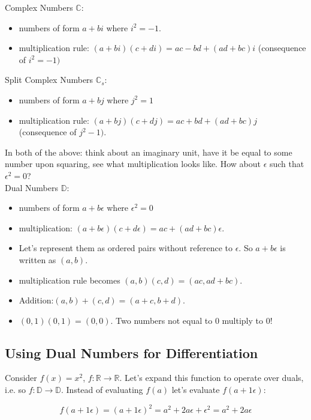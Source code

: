 \documentclass[11pt]{article}
\theoremstyle{definition}
\theoremstyle{plain}
\renewcommand{\b}[1]{\mathbb{#1}}
\begin{document}
\noindent Complex Numbers $\b{C}$:
\begin{itemize}
    \item numbers of form $a + bi$ where $i^2=-1$.
    \item multiplication rule: $(a+bi)(c+di) = ac - bd + (ad + bc)i$ 
          (consequence of $i^2=-1)$
\end{itemize}

\noindent Split Complex Numbers $\b{C}_s$:
\begin{itemize}
    \item numbers of form $a + bj$ where $j^2=1$ 
    \item multiplication rule: $(a + bj)(c + dj) = ac + bd + (ad + bc)j$ 
          (consequence of $j^2-1)$.
\end{itemize}

\noindent In both of the above: think about an imaginary unit, 
have it be equal to some number upon squaring, see what multiplication looks like.
How about $\epsilon$ such that $\epsilon^2=0$?\\

\noindent Dual Numbers $\b{D}$: 
\begin{itemize}
    \item numbers of form $a + b \epsilon$ where $\epsilon^2 = 0$
    \item multiplication: $(a + b \epsilon)(c + d \epsilon) = ac + (ad+bc)\epsilon$.
    \item Let's represent them as ordered pairs without reference to $\epsilon$.
    So $a + b\epsilon$ is written as $(a,b)$.
    \item multiplication rule becomes $(a,b)(c,d)=(ac,ad+bc)$. 
    \item Addition:$(a,b)+(c,d)=(a+c,b+d)$.
    \item $(0,1)(0,1)=(0,0)$. Two numbers not equal to $0$ multiply
    to $0$!
\end{itemize}

\newpage

\subsection{Using Dual Numbers for Differentiation}

Consider $f(x)=x^2$, $f: \b{R} \rightarrow \b{R}$. Let's expand this function to operate over duals, i.e. so $f: \b{D} \rightarrow \b{D}$.
Instead of evaluating $f(a)$ let's evaluate $f(a + 1 \epsilon)$:

$$f(a + 1\epsilon) = (a+1\epsilon)^2 = a^2 + 2a\epsilon + \epsilon^2 = a^2 + 2a \epsilon $$
\end{document}
